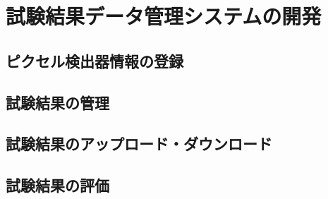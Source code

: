 \chapter{試験結果データ管理システムの開発}

\section{ピクセル検出器情報の登録}

\section{試験結果の管理}

\section{試験結果のアップロード・ダウンロード}

\section{試験結果の評価}

\newpage

